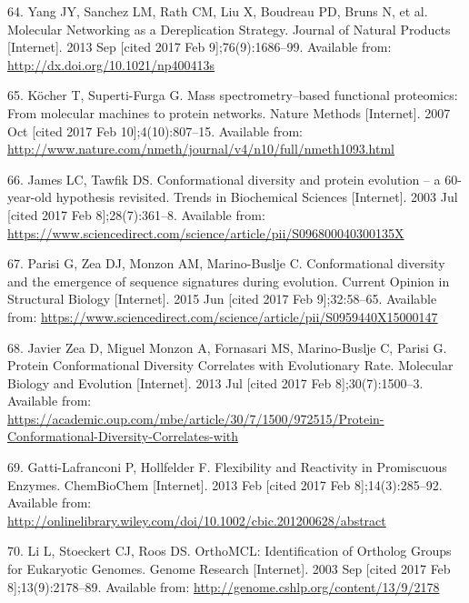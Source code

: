 \documentclass[12pt,twoside]{reedthesis}
\begin{document}
  \hypertarget{ref-yang_molecular_2013}{}
  64. Yang JY, Sanchez LM, Rath CM, Liu X, Boudreau PD, Bruns N, et al.
  Molecular Networking as a Dereplication Strategy. Journal of Natural
  Products {[}Internet{]}. 2013 Sep {[}cited 2017 Feb 9{]};76(9):1686--99.
  Available from: \url{http://dx.doi.org/10.1021/np400413s}
  
  \hypertarget{ref-kocher_mass_2007}{}
  65. Köcher T, Superti-Furga G. Mass spectrometry--based functional
  proteomics: From molecular machines to protein networks. Nature Methods
  {[}Internet{]}. 2007 Oct {[}cited 2017 Feb 10{]};4(10):807--15.
  Available from:
  \url{http://www.nature.com/nmeth/journal/v4/n10/full/nmeth1093.html}
  
  \hypertarget{ref-james_conformational_2003}{}
  66. James LC, Tawfik DS. Conformational diversity and protein evolution
  -- a 60-year-old hypothesis revisited. Trends in Biochemical Sciences
  {[}Internet{]}. 2003 Jul {[}cited 2017 Feb 8{]};28(7):361--8. Available
  from:
  \url{https://www.sciencedirect.com/science/article/pii/S096800040300135X}
  
  \hypertarget{ref-parisi_conformational_2015}{}
  67. Parisi G, Zea DJ, Monzon AM, Marino-Buslje C. Conformational
  diversity and the emergence of sequence signatures during evolution.
  Current Opinion in Structural Biology {[}Internet{]}. 2015 Jun {[}cited
  2017 Feb 9{]};32:58--65. Available from:
  \url{https://www.sciencedirect.com/science/article/pii/S0959440X15000147}
  
  \hypertarget{ref-javier_zea_protein_2013}{}
  68. Javier Zea D, Miguel Monzon A, Fornasari MS, Marino-Buslje C, Parisi
  G. Protein Conformational Diversity Correlates with Evolutionary Rate.
  Molecular Biology and Evolution {[}Internet{]}. 2013 Jul {[}cited 2017
  Feb 8{]};30(7):1500--3. Available from:
  \url{https://academic.oup.com/mbe/article/30/7/1500/972515/Protein-Conformational-Diversity-Correlates-with}
  
  \hypertarget{ref-gatti-lafranconi_flexibility_2013}{}
  69. Gatti-Lafranconi P, Hollfelder F. Flexibility and Reactivity in
  Promiscuous Enzymes. ChemBioChem {[}Internet{]}. 2013 Feb {[}cited 2017
  Feb 8{]};14(3):285--92. Available from:
  \url{http://onlinelibrary.wiley.com/doi/10.1002/cbic.201200628/abstract}
  
  \hypertarget{ref-li_orthomcl_2003}{}
  70. Li L, Stoeckert CJ, Roos DS. OrthoMCL: Identification of Ortholog
  Groups for Eukaryotic Genomes. Genome Research {[}Internet{]}. 2003 Sep
  {[}cited 2017 Feb 8{]};13(9):2178--89. Available from:
  \url{http://genome.cshlp.org/content/13/9/2178}
  
\end{document}
